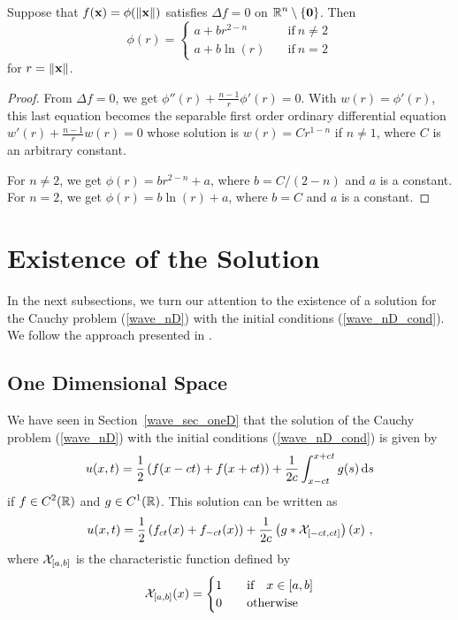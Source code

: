 \begin{cor} \label{laplace_sharm}
Suppose that $f(\mathbf{x}) = \phi(\|\mathbf{x}\|)$ satisfies
$\Delta f = 0$ on $\displaystyle \mathbb{R}^n \setminus \{\mathbf{0}\}$.  Then
\[
\phi(r) =
\begin{cases}
a + b r^{2-n} & \quad \text{if} \ n \neq 2 \\
a+b \ln(r) & \quad \text{if} \ n=2
\end{cases}
\]
for $r = \|\mathbf{x}\|$.
\end{cor}

\begin{proof}
From $\Delta f = 0$, we get
$\displaystyle \phi''(r) + \frac{n-1}{r} \phi'(r) = 0$.
With $w(r) = \phi'(r)$, this last equation becomes the separable first
order ordinary differential equation
$\displaystyle w'(r) + \frac{n-1}{r} w(r) = 0$
whose solution is $w(r) = C r^{1-n}$ if $n\neq 1$, where $C$
is an arbitrary constant.

For $n\neq 2$, we get $\phi(r) = b r^{2-n} + a$,
where $b=C/(2-n)$ and $a$ is a constant.  For $n=2$, we get
$\phi(r) = b\ln(r) + a$, where $b=C$ and $a$ is a constant.
\end{proof}

\section{Existence of the Solution} \label{SectWavenDExSol}

In the next subsections, we turn our attention to the existence of a
solution for the Cauchy problem (\ref{wave_nD}) with the initial conditions
(\ref{wave_nD_cond}).  We follow the approach presented in \cite{FoPDE}.

\subsection{One Dimensional Space}

We have seen in Section~\ref{wave_sec_oneD} that the solution of the
Cauchy problem (\ref{wave_nD}) with the initial conditions
(\ref{wave_nD_cond}) is given by
\[
u(x,t) = \frac{1}{2} \left(f(x-ct) + f(x+ct)\right)
+ \frac{1}{2c} \int_{x-ct}^{x+ct} g(s)\,\mathrm{d}{s}
\]
if $\displaystyle f \in C^2(\mathbb{R})$ and $\displaystyle g \in C^1(\mathbb{R})$.
This solution can be written as
\begin{equation} \label{wave_sol_oneD_conv}
u(x,t) = \frac{1}{2} \left( f_{ct}(x) + f_{-ct}(x) \right) +
\frac{1}{2c} \left(g \ast {\cal X}_{[-ct,ct]}\right)(x) \ ,
\end{equation}
where ${\cal X}_{[a,b]}$ is the characteristic function defined by
\[
{\cal X}_{[a,b]}(x) = \begin{cases}
1 & \quad \text{if} \quad x \in [a,b] \\
0 & \quad \text{otherwise}
\end{cases}
\]

